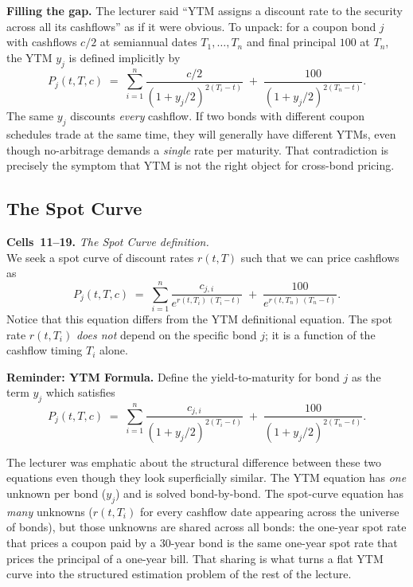 \begin{tipblock}
\textbf{Filling the gap.} The lecturer said ``YTM assigns a discount rate to
the security across all its cashflows'' as if it were obvious. To unpack: for
a coupon bond $j$ with cashflows $c/2$ at semiannual dates $T_1,\dots,T_n$ and
final principal $100$ at $T_n$, the YTM $y_j$ is defined implicitly by
\[
   P_j(t,T,c) \;=\; \sum_{i=1}^{n} \frac{c/2}{(1+y_j/2)^{2(T_i - t)}}
                     \;+\; \frac{100}{(1+y_j/2)^{2(T_n-t)}}.
\]
The same $y_j$ discounts \emph{every} cashflow. If two bonds with different
coupon schedules trade at the same time, they will generally have different
YTMs, even though no-arbitrage demands a \emph{single} rate per maturity. That
contradiction is precisely the symptom that YTM is not the right object for
cross-bond pricing.
\end{tipblock}

\subsection{The Spot Curve}\label{L1-sec:spot-curve}

\begin{keyblock}
\textbf{Cells~11--19.} \emph{The Spot Curve definition.}\\
We seek a spot curve of discount rates $r(t,T)$ such that we can price
cashflows as
\[
    P_j(t,T,c) \;=\; \sum_{i=1}^{n}\frac{c_{j,i}}{e^{r(t,T_i)\,(T_i-t)}}
                     \;+\; \frac{100}{e^{r(t,T_n)\,(T_n-t)}}.
\]
Notice that this equation differs from the YTM definitional equation. The spot
rate $r(t,T_i)$ \emph{does not} depend on the specific bond $j$; it is a
function of the cashflow timing $T_i$ alone.

\textbf{Reminder: YTM Formula.} Define the yield-to-maturity for bond $j$ as
the term $y_j$ which satisfies
\[
    P_j(t,T,c) \;=\; \sum_{i=1}^{n} \frac{c_{j,i}}{(1+y_j/2)^{2(T_i-t)}}
                     \;+\; \frac{100}{(1+y_j/2)^{2(T_n-t)}}.
\]
\end{keyblock}

The lecturer was emphatic about the structural difference between these two
equations even though they look superficially similar. The YTM equation has
\emph{one} unknown per bond ($y_j$) and is solved bond-by-bond. The spot-curve
equation has \emph{many} unknowns ($r(t,T_i)$ for every cashflow date appearing
across the universe of bonds), but those unknowns are shared across all bonds:
the one-year spot rate that prices a coupon paid by a 30-year bond is the same
one-year spot rate that prices the principal of a one-year bill. That sharing
is what turns a flat YTM curve into the structured estimation problem of the
rest of the lecture.

